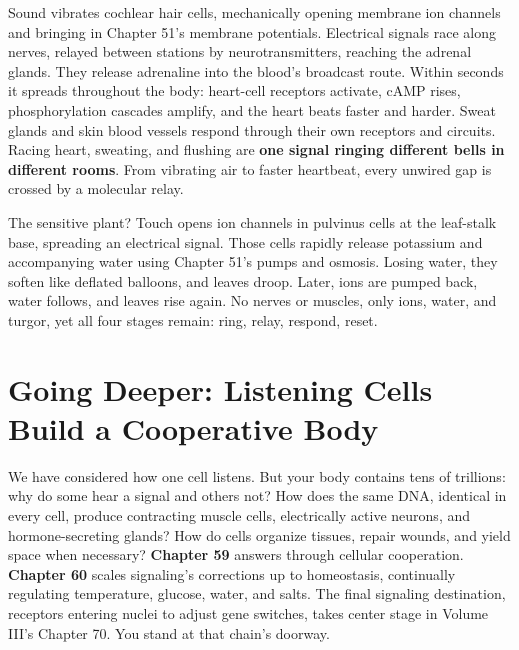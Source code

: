 Sound vibrates cochlear hair cells, mechanically opening membrane ion channels and bringing in Chapter 51's membrane potentials. Electrical signals race along nerves, relayed between stations by neurotransmitters, reaching the adrenal glands. They release adrenaline into the blood's broadcast route. Within seconds it spreads throughout the body: heart-cell receptors activate, cAMP rises, phosphorylation cascades amplify, and the heart beats faster and harder. Sweat glands and skin blood vessels respond through their own receptors and circuits. Racing heart, sweating, and flushing are \textbf{one signal ringing different bells in different rooms}. From vibrating air to faster heartbeat, every unwired gap is crossed by a molecular relay.

The sensitive plant? Touch opens ion channels in pulvinus cells at the leaf-stalk base, spreading an electrical signal. Those cells rapidly release potassium and accompanying water using Chapter 51's pumps and osmosis. Losing water, they soften like deflated balloons, and leaves droop. Later, ions are pumped back, water follows, and leaves rise again. No nerves or muscles, only ions, water, and turgor, yet all four stages remain: ring, relay, respond, reset.

\section{Going Deeper: Listening Cells Build a Cooperative Body}

We have considered how one cell listens. But your body contains tens of trillions: why do some hear a signal and others not? How does the same DNA, identical in every cell, produce contracting muscle cells, electrically active neurons, and hormone-secreting glands? How do cells organize tissues, repair wounds, and yield space when necessary? \textbf{Chapter 59} answers through cellular cooperation. \textbf{Chapter 60} scales signaling's corrections up to homeostasis, continually regulating temperature, glucose, water, and salts. The final signaling destination, receptors entering nuclei to adjust gene switches, takes center stage in Volume III's Chapter 70. You stand at that chain's doorway.

